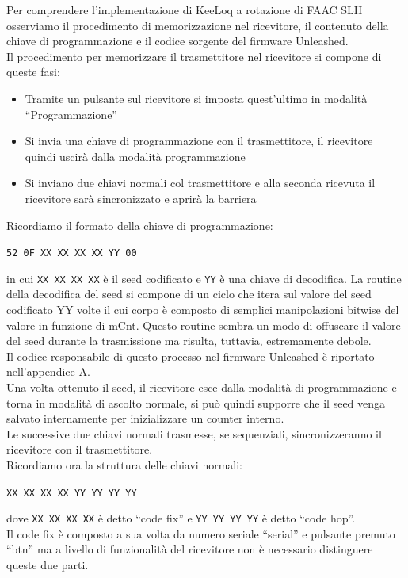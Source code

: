 Per comprendere l’implementazione di KeeLoq a rotazione di FAAC SLH osserviamo il procedimento di memorizzazione nel ricevitore, il contenuto della chiave di programmazione e il codice sorgente del firmware Unleashed.\\
Il procedimento per memorizzare il trasmettitore nel ricevitore si compone di queste fasi:
\begin{itemize}
  \item Tramite un pulsante sul ricevitore si imposta quest’ultimo in modalità “Programmazione”
  \item Si invia una chiave di programmazione con il trasmettitore, il ricevitore quindi uscirà dalla modalità programmazione
  \item Si inviano due chiavi normali col trasmettitore e alla seconda ricevuta il ricevitore sarà sincronizzato e aprirà la barriera
\end{itemize}
Ricordiamo il formato della chiave di programmazione:
\begin{center}
  \texttt{52 0F XX XX XX XX YY 00}
\end{center}
in cui \texttt{XX XX XX XX} è il seed codificato e \texttt{YY} è una chiave di decodifica.
La routine della decodifica del seed si compone di un ciclo che itera sul valore del seed codificato YY volte il cui corpo è composto di semplici manipolazioni bitwise del valore in funzione di mCnt. Questo routine sembra un modo di offuscare il valore del seed durante la trasmissione ma risulta, tuttavia, estremamente debole.\\
Il codice responsabile di questo processo nel firmware Unleashed è riportato nell'appendice A.\\
Una volta ottenuto il seed, il ricevitore esce dalla modalità di programmazione e torna in modalità di ascolto normale, si può quindi supporre che il seed venga salvato internamente per inizializzare un counter interno.\\
Le successive due chiavi normali trasmesse, se sequenziali, sincronizzeranno il ricevitore con il trasmettitore.\\
Ricordiamo ora la struttura delle chiavi normali:
\begin{center}
  \texttt{XX XX XX XX YY YY YY YY}
\end{center}
dove \texttt{XX XX XX XX} è detto “code fix” e \texttt{YY YY YY YY} è detto “code hop”.\\
Il code fix è composto a sua volta da numero seriale “serial” e pulsante premuto “btn” ma a livello di funzionalità del ricevitore non è necessario distinguere queste due parti.\\
